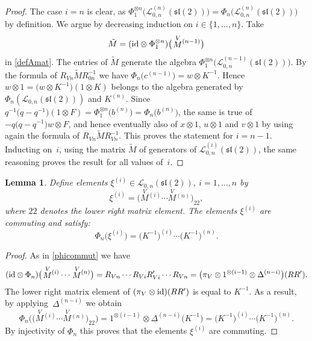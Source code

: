 \documentclass[pdftex]{sigma}%
\numberwithin{equation}{section}
\numberwithin{figure}{section}
\newtheorem{lem}[teo]{Lemma}
\newcommand{\Ll}{{\mathcal L}}
\begin{document}
\begin{proof} The case $i=n$ is clear, as $\Phi_1^{\otimes n}\big(\Ll_{0,n}^{(n)}({\mathfrak{sl}}(2))\big) = \Phi_n\big(\Ll_{0,n}^{(n)}({\mathfrak{sl}}(2))\big)$ by definition. We argue by decreasing induction on $i\in \{1,\dots,n\}$. Take
\[
\tilde{M} = ({\rm id}\otimes \Phi_1^{\otimes n})\big(\!\stackrel{V}{M}{}^{\!\! (n-1)}\big)
\]
in \eqref{defAmat}. The entries of $\tilde{M}$ generate the algebra $\Phi_1^{\otimes n}\big(\Ll_{0,n}^{(n-1)}({\mathfrak{sl}}(2))\big)$. By the formula of $R_{Vn} \tilde{M} R_{0n}^{-1}$ we have $\Phi_n\big(c^{(n-1)}\big) = w\otimes K^{-1}$. Hence $w\otimes 1 = \big(w\otimes K^{-1}\big)(1\otimes K)$ belongs to the algebra generated by $\Phi_n(\Ll_{0,n}({\mathfrak{sl}}(2)))$ and $K^{(n)}$. Since $q^{-1}\big(q-q^{-1}\big)(1\otimes F) = \Phi_1^{\otimes n}\big(b^{(n)}\big) = \Phi_n\big(b^{(n)}\big)$, the same is true of $-q\big(q-q^{-1}\big)w \otimes F$, and hence eventually also of $x\otimes 1$, $u\otimes 1$ and $v\otimes 1$ by using again the formula of $R_{Vn} \tilde{M} R_{Vn}^{-1}$. This proves the statement for $i=n-1$. Inducting on~$i$, using the matrix $\tilde{M}$ of generators of $\Ll_{0,n}^{(i)}({\mathfrak{sl}}(2))$, the same reasoning proves the result for all values of~$i$. \end{proof}

\begin{lem} Define elements $\xi^{(i)}\in \Ll_{0,n}({\mathfrak{sl}}(2))$, $i=1,\dots,n$ by
\begin{equation*}%
\xi^{(i)}=\big(\!\stackrel{V}{M}{}^{\!\! (i)}\cdots \stackrel{V}{M}{}^{\!\! (n)}\big)_{22},
\end{equation*}
where $22$ denotes the lower right matrix element. The elements $\xi^{(i)}$ are commuting and satisfy:
\begin{equation*}
\Phi_n\big(\xi^{(i)}\big)=\big(K^{-1}\big)^{(i)}\cdots \big(K^{-1}\big)^{(n)}.
\end{equation*}
\end{lem}
\begin{proof} As in \eqref{phicommut} we have
\begin{gather*}
({\rm id} \otimes \Phi_n)\big(\!\stackrel{V}{M}{}^{\!\! (i)}\cdots \stackrel{V}{M}{}^{\!\! (n)}\big) = R_{Vn}\cdots R_{Vi}R_{Vi}' \cdots R_{Vn}=\big(\pi_{V}\otimes 1^{\otimes (i-1)}\otimes \Delta^{(n-i)}\big)(RR').
\end{gather*}
The lower right matrix element of $(\pi_{V}\otimes {\rm id} )(RR')$ is equal to $K^{-1}$. As a result, by applying~$\Delta^{(n-i)}$ we obtain
 \begin{equation*}%
\Phi_n\big(\big(\!\stackrel{V}{M}{}^{\!\! (i)}\cdots \stackrel{V}{M}{}^{\!\! (n)}\big)_{22}\big) = 1^{\otimes (i-1)}\otimes \Delta^{(n-i)}\big(K^{-1}\big)=\big(K^{-1}\big)^{(i)}\cdots \big(K^{-1}\big)^{(n)}.
\end{equation*}
By injectivity of $\Phi_n$ this proves that the elements $\xi^{(i)}$ are commuting. \end{proof}
\end{document}
